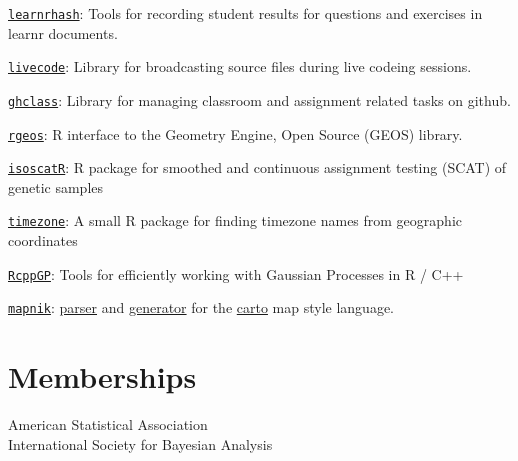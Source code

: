 \documentclass[margin,line]{res}
\begin{document}
\begin{resume}
\href{https://github.com/rundel/learnrhash}{\texttt{learnrhash}}: Tools for recording student results for questions and exercises in learnr documents.

\href{https://github.com/rundel/livecode}{\texttt{livecode}}: Library for broadcasting source files during live codeing sessions.

\href{https://github.com/rundel/ghclass}{\texttt{ghclass}}: Library for managing classroom and assignment related tasks on github.

\href{https://github.com/rundel/rgeos}{\texttt{rgeos}}: R interface to the Geometry Engine, Open Source (GEOS) library.

\vspace{-0.15cm}
\href{https://github.com/rundel/isoscatR}{\texttt{isoscatR}}: R package for smoothed and continuous assignment testing (SCAT) of genetic samples

\vspace{-0.15cm}
\href{https://github.com/rundel/timezone}{\texttt{timezone}}: A small R package for finding timezone names from geographic coordinates

\vspace{-0.15cm}
\href{https://github.com/rundel/RcppGP}{\texttt{RcppGP}}: Tools for efficiently working with Gaussian Processes in R / C++

\vspace{-0.15cm}
\href{http://mapnik.org}{\texttt{mapnik}}: \href{https://github.com/rundel/carto-parser}{parser} and \href{https://github.com/rundel/carto-generator}{generator} for the \href{https://github.com/mapbox/carto}{carto} map style language.

\vspace{4mm}

\section{\sc Memberships}
American Statistical Association \\
International Society for Bayesian Analysis

\end{resume}
\end{document}
